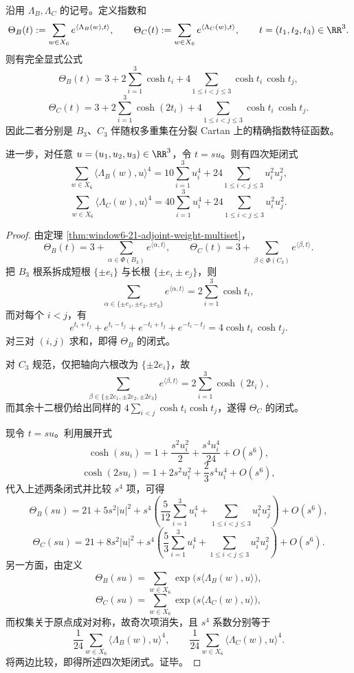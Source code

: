 \begin{theorem}\label{thm:window6-b3c3-adjoint-character-and-quartic-invariant}
沿用 \(\Lambda_B,\Lambda_C\) 的记号。定义指数和
\[
\Theta_B(t):=\sum_{w\in X_6}e^{\langle \Lambda_B(w),t\rangle},
\qquad
\Theta_C(t):=\sum_{w\in X_6}e^{\langle \Lambda_C(w),t\rangle},
\qquad
t=(t_1,t_2,t_3)\in \RR^3.
\]
则有完全显式公式
\[
\Theta_B(t)
=
3+2\sum_{i=1}^{3}\cosh t_i
+4\sum_{1\le i<j\le 3}\cosh t_i\,\cosh t_j,
\]
\[
\Theta_C(t)
=
3+2\sum_{i=1}^{3}\cosh(2t_i)
+4\sum_{1\le i<j\le 3}\cosh t_i\,\cosh t_j.
\]
因此二者分别是 \(B_3\)、\(C_3\) 伴随权多重集在分裂 Cartan 上的精确指数特征函数。

进一步，对任意 \(u=(u_1,u_2,u_3)\in\RR^3\)，令 \(t=su\)。则有四次矩闭式
\[
\sum_{w\in X_6}\langle \Lambda_B(w),u\rangle^4
=
10\sum_{i=1}^{3}u_i^4+24\sum_{1\le i<j\le 3}u_i^2u_j^2,
\]
\[
\sum_{w\in X_6}\langle \Lambda_C(w),u\rangle^4
=
40\sum_{i=1}^{3}u_i^4+24\sum_{1\le i<j\le 3}u_i^2u_j^2.
\]
\end{theorem}
\begin{proof}
由定理 \ref{thm:window6-21-adjoint-weight-multiset}，
\[
\Theta_B(t)=3+\sum_{\alpha\in \Phi(B_3)}e^{\langle \alpha,t\rangle},
\qquad
\Theta_C(t)=3+\sum_{\beta\in \Phi(C_3)}e^{\langle \beta,t\rangle}.
\]
把 \(B_3\) 根系拆成短根 \(\{\pm e_i\}\) 与长根 \(\{\pm e_i\pm e_j\}\)，则
\[
\sum_{\alpha\in \{\pm e_1,\pm e_2,\pm e_3\}}e^{\langle \alpha,t\rangle}
=2\sum_{i=1}^{3}\cosh t_i,
\]
而对每个 \(i<j\)，有
\[
e^{t_i+t_j}+e^{t_i-t_j}+e^{-t_i+t_j}+e^{-t_i-t_j}
=4\cosh t_i\,\cosh t_j.
\]
对三对 \((i,j)\) 求和，即得 \(\Theta_B\) 的闭式。

对 \(C_3\) 规范，仅把轴向六根改为 \(\{\pm 2e_i\}\)，故
\[
\sum_{\beta\in \{\pm 2e_1,\pm 2e_2,\pm 2e_3\}}e^{\langle \beta,t\rangle}
=2\sum_{i=1}^{3}\cosh(2t_i),
\]
而其余十二根仍给出同样的
\(
4\sum_{i<j}\cosh t_i\cosh t_j
\)，遂得 \(\Theta_C\) 的闭式。

现令 \(t=su\)。利用展开式
\[
\cosh(su_i)=1+\frac{s^2u_i^2}{2}+\frac{s^4u_i^4}{24}+O(s^6),
\]
\[
\cosh(2su_i)=1+2s^2u_i^2+\frac{2}{3}s^4u_i^4+O(s^6),
\]
代入上述两条闭式并比较 \(s^4\) 项，可得
\[
\Theta_B(su)
=
21+5s^2|u|^2
+s^4\!\left(
\frac{5}{12}\sum_{i=1}^{3}u_i^4
+\sum_{1\le i<j\le 3}u_i^2u_j^2
\right)+O(s^6),
\]
\[
\Theta_C(su)
=
21+8s^2|u|^2
+s^4\!\left(
\frac{5}{3}\sum_{i=1}^{3}u_i^4
+\sum_{1\le i<j\le 3}u_i^2u_j^2
\right)+O(s^6).
\]
另一方面，由定义
\[
\Theta_B(su)=\sum_{w\in X_6}\exp\!\bigl(s\langle \Lambda_B(w),u\rangle\bigr),
\]
\[
\Theta_C(su)=\sum_{w\in X_6}\exp\!\bigl(s\langle \Lambda_C(w),u\rangle\bigr),
\]
而权集关于原点成对对称，故奇次项消失，且 \(s^4\) 系数分别等于
\[
\frac{1}{24}\sum_{w\in X_6}\langle \Lambda_B(w),u\rangle^4,
\qquad
\frac{1}{24}\sum_{w\in X_6}\langle \Lambda_C(w),u\rangle^4.
\]
将两边比较，即得所述四次矩闭式。证毕。
\end{proof}

